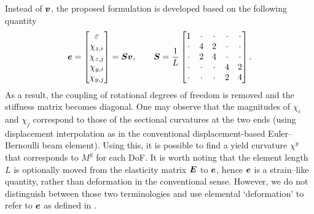 Instead of $\bm{v}$, the proposed formulation is developed based on the following quantity
\begin{gather}\label{nm:kinematics}
\bm{e}=\begin{bmatrix}
\varepsilon\\\chi_{z,i}\\\chi_{z,j}\\\chi_{y,i}\\\chi_{y,j}
\end{bmatrix}=\bm{S}\bm{v},\qquad\bm{S}=\dfrac{1}{L}\begin{bmatrix}
1&\cdot&\cdot&\cdot&\cdot\\
\cdot&4&2&\cdot&\cdot\\
\cdot&2&4&\cdot&\cdot\\
\cdot&\cdot&\cdot&4&2\\
\cdot&\cdot&\cdot&2&4
\end{bmatrix}.
\end{gather}
As a result, the coupling of rotational degrees of freedom is removed and the stiffness matrix becomes diagonal.
One may observe that the magnitudes of $\chi_i$ and $\chi_j$ correspond to those of the sectional curvatures at the two ends (using displacement interpolation as in the conventional displacement-based Euler--Bernoulli beam element).
Using this, it is possible to find a yield curvature $\chi^y$ that corresponds to $M^y$ for each DoF.
It is worth noting that the element length $L$ is optionally moved from the elasticity matrix $\bm{E}$ to $\bm{e}$, hence $\bm{e}$ is a strain--like quantity, rather than deformation in the conventional sense.
However, we do not distinguish between those two terminologies and use elemental `deformation' to refer to $\bm{e}$ as defined in .

